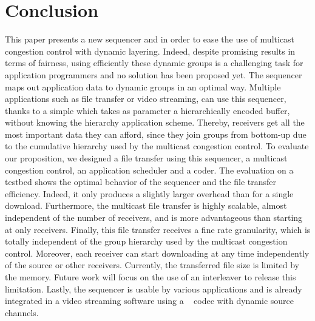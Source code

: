\documentclass[a4paper]{article}
\begin{document}
\section{Conclusion}
    This paper presents a new sequencer and  in order to ease the use of
    multicast congestion control with dynamic layering. Indeed, despite
    promising results in terms of fairness, using efficiently these dynamic
    groups is a challenging task for application programmers and no solution has
    been proposed yet.
The sequencer maps out application data to dynamic groups in an optimal way.
    Multiple applications such as file transfer or video streaming, can use this
    sequencer, thanks to a simple  which takes as parameter a
    hierarchically encoded buffer, without knowing the hierarchy application
    scheme.  Thereby, receivers get all the most important data they can afford,
    since they join groups from bottom-up due to the cumulative hierarchy used
    by the multicast congestion control. 
To evaluate our proposition, we designed a file transfer using
    this sequencer, a multicast congestion control, an application scheduler and
    a  coder.
The evaluation on a testbed shows the optimal behavior of the sequencer and
    the file transfer efficiency.  Indeed, it only produces a slightly larger
    overhead than  for a single download.  Furthermore, the multicast file
    transfer is highly scalable, almost independent of the number of receivers,
    and is more advantageous than  starting at only  receivers.
Finally, this file transfer receives a fine rate granularity, which
    is totally independent of the group hierarchy used by the multicast
    congestion control. Moreover, each receiver can start downloading at any
    time independently of the source or other receivers.
Currently, the transferred file size is limited by the  memory.
    Future work will focus on the use of an interleaver to release this
    limitation.
Lastly, the sequencer  is usable by various applications and is already
    integrated in a video streaming software using a
    ~\cite{mccanne_low-complexity_1997} codec with dynamic source channels.



\end{document}
